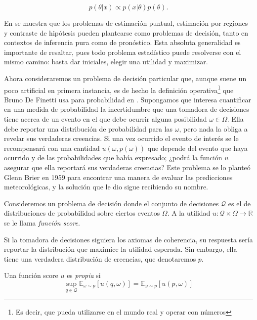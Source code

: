\documentclass[main.tex]{subfiles}
\begin{document}
\begin{equation*}
	p(\theta | x ) 	\propto p(x|\theta)p(\theta).
\end{equation*}

En \cite{bernardo} se muestra que los problemas de estimación puntual, estimación por regiones y contraste de hipótesis pueden plantearse como problemas de decisión, tanto en contextos de inferencia pura como de pronóstico. Esta absoluta generalidad es importante de resaltar, pues todo problema estadístico puede resolverse con el mismo camino: basta dar iniciales, elegir una utilidad y maximizar.

Ahora consideraremos un problema de decisión particular que, aunque suene un poco artificial en primera instancia, es de hecho la definición operativa\footnote{Es decir, que pueda utilizarse en el mundo real y operar con números} que Bruno De Finetti usa para probabilidad en \cite{definetti2008}.  Supongamos que interesa cuantificar en una medida de probabilidad la incertidumbre que una tomadora de decisiones tiene acerca de un evento en el que debe ocurrir alguna posibilidad  $\omega \in \Omega$. Ella debe reportar una distribución de probabilidad para las $\omega$, pero nada la obliga a revelar sus verdaderas creencias. Si una vez ocurrido el evento de interés se le recompensará con una cantidad $u(\omega,p(\omega))$ que depende del evento que haya ocurrido y de las probabilidades que había expresado; ¿podrá la función $u$  asegurar que ella reportará sus verdaderas creencias?  Este problema se lo planteó Glenn Brier en 1959 para encontrar una manera de evaluar las predicciones meteorológicas, y la solución que le dio sigue recibiendo su nombre. 

\begin{definition}
	Consideremos un problema de decisión donde el conjunto de decisiones $\mathcal{Q}$ es el de distribuciones de probabilidad sobre ciertos eventos $\Omega$. A la utilidad $u: \mathcal{Q}\times\Omega \to \mathbb{R}$ se le llama \textit{función score}.
\end{definition}

Si la tomadora de decisiones siguiera los axiomas de coherencia, su respuesta sería reportar la distribución que maximice la utilidad esperada. Sin embargo, ella tiene una verdadera distribución de creencias, que denotaremos $p$. 

\begin{definition}
	Una función score $u$ es \textit{propia} si
	\begin{equation*}
		\sup_{q \in \mathcal{Q}} \mathbb{E}_{\omega\sim p}\left[u(q,\omega)\right] = \mathbb{E}_{\omega\sim p}\left[u(p,\omega)\right]
	\end{equation*}
\end{definition}
\end{document}
